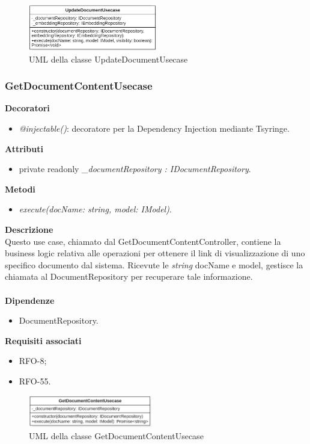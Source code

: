 \begin{figure}[h!]
    \centering  
    \includegraphics[width=0.5\textwidth]{UpdateDocumentUsecase.png}
    \caption{UML della classe UpdateDocumentUsecase}
\end{figure}

\subsubsection{GetDocumentContentUsecase}
\textbf{Decoratori}
\begin{itemize}
    \item \textit{@injectable()}: decoratore per la Dependency Injection mediante Tsyringe.
\end{itemize}
\textbf{Attributi}
\begin{itemize}
    \item private readonly \textit{\_documentRepository : IDocumentRepository}.
\end{itemize}
\textbf{Metodi}
\begin{itemize}
    \item \textit{execute(docName: string, model: IModel)}.
\end{itemize}
\textbf{Descrizione}\\
Questo use case, chiamato dal GetDocumentContentController, contiene la business logic relativa alle operazioni per ottenere il link di visualizzazione di uno specifico documento dal sistema. Ricevute le \textit{string} docName e model, gestisce la chiamata al DocumentRepository per recuperare tale informazione.\\ \\
\textbf{Dipendenze}
\begin{itemize}
    \item DocumentRepository.
\end{itemize}
\textbf{Requisiti associati}
\begin{itemize}[itemsep=-4pt]
    \item RFO-8;
    \item RFO-55.
\end{itemize}

\begin{figure}[h!]
    \centering  
    \includegraphics[width=0.48\textwidth]{GetDocumentContentUsecase.png} %
    \caption{UML della classe GetDocumentContentUsecase}
\end{figure}

